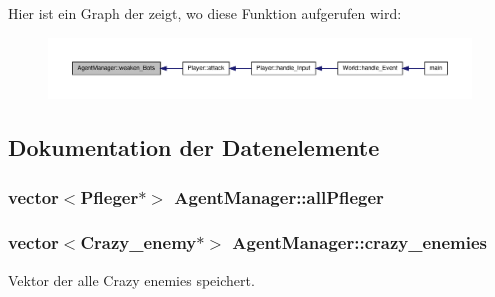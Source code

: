 Hier ist ein Graph der zeigt, wo diese Funktion aufgerufen wird\-:\nopagebreak
\begin{figure}[H]
\begin{center}
\leavevmode
\includegraphics[width=350pt]{class_agent_manager_aafa2ae19bfa65b44dc3c955bd21e0fc3_icgraph}
\end{center}
\end{figure}




\subsection{Dokumentation der Datenelemente}
\hypertarget{class_agent_manager_a1c7aff8c522d35fd1514eb953195be92}{
\subsubsection[{all\-Pfleger}]{\setlength{\rightskip}{0pt plus 5cm}vector$<${\bf Pfleger}$\ast$$>$ Agent\-Manager\-::all\-Pfleger\hspace{0.3cm}{\ttfamily [private]}}}\label{class_agent_manager_a1c7aff8c522d35fd1514eb953195be92}
\hypertarget{class_agent_manager_a3a921dcdcad9845bb40ec0cf67b6cd2e}{
\subsubsection[{crazy\-\_\-enemies}]{\setlength{\rightskip}{0pt plus 5cm}vector$<${\bf Crazy\-\_\-enemy}$\ast$$>$ Agent\-Manager\-::crazy\-\_\-enemies\hspace{0.3cm}{\ttfamily [private]}}}\label{class_agent_manager_a3a921dcdcad9845bb40ec0cf67b6cd2e}


Vektor der alle Crazy enemies speichert. 

